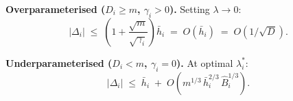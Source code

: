 \begin{corollary}
\label{cor:regimes}
\mbox{}

\noindent\textbf{Overparameterised ($D_i \geq m$,
$\gamma_i > 0$).}
Setting $\lambda \to 0$:
\begin{equation}
    |\Delta_i|
    \;\leq\;
    \left(1+\frac{\sqrt{m}}{\sqrt{\gamma_i}}\right)
    \bar{h}_i
    \;=\;
    O(\bar{h}_i)
    \;=\;
    O(1/\sqrt{D}).
    \label{eq:gap_over}
\end{equation}

\noindent\textbf{Underparameterised ($D_i < m$,
$\gamma_i = 0$).}
At optimal $\lambda^*_i$:
\begin{equation}
    |\Delta_i|
    \;\leq\;
    \bar{h}_i
    \;+\;
    O\!\left(
    m^{1/3}\,\bar{h}_i^{2/3}\,\hat{B}_i^{1/3}
    \right).
    \label{eq:gap_under}
\end{equation}
\end{corollary}